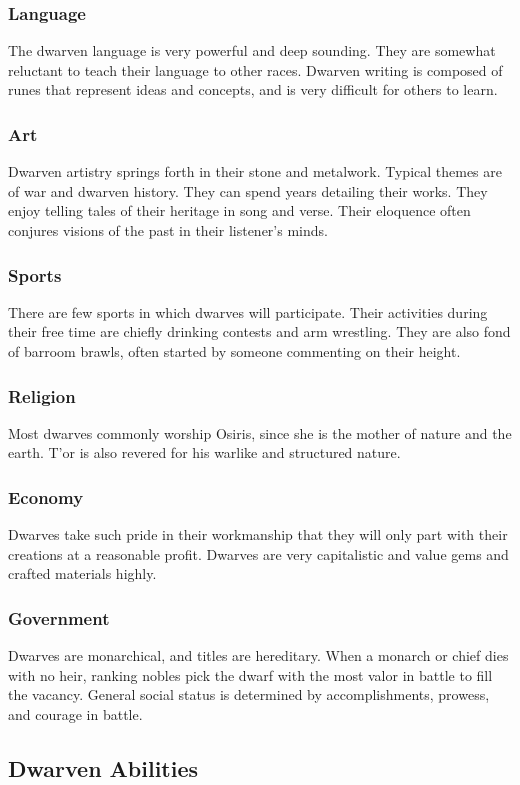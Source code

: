 \begin{multicols*}{2}
\subsubsection{Language}
The dwarven language is very powerful and deep sounding. They are somewhat reluctant to teach their language to other races. Dwarven writing is composed of runes that represent ideas and concepts, and is very difficult for others to learn.
\subsubsection{Art}
Dwarven artistry springs forth in their stone and metalwork. Typical themes are of war and dwarven history. They can spend years detailing their works. They enjoy telling tales of their heritage in song and verse. Their eloquence often conjures visions of the past in their listener's minds.
\subsubsection{Sports}
There are few sports in which dwarves will participate. Their activities during their free time are chiefly drinking contests and arm wrestling. They are also fond of barroom brawls, often started by someone commenting on their height.
\subsubsection{Religion}
Most dwarves commonly worship Osiris, since she is the mother of nature and the earth. T'or is also revered for his warlike and structured nature.
\subsubsection{Economy}
Dwarves take such pride in their workmanship that they will only part with their creations at a reasonable profit. Dwarves are very capitalistic and value gems and crafted materials highly.
\subsubsection{Government}
Dwarves are monarchical, and titles are hereditary. When a monarch or chief dies with no heir, ranking nobles pick the dwarf with the most valor in battle to fill the vacancy. General social status is determined by accomplishments, prowess, and courage in battle.
\subsection{Dwarven Abilities}

\end{multicols*}
